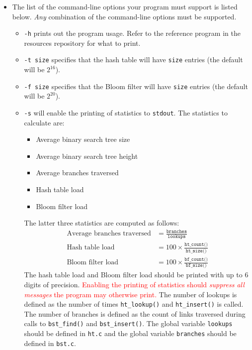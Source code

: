 \begin{itemize}
  \item The list of the command-line options your program must support
    is listed below. \emph{Any} combination of the command-line options
    must be supported.
    \begin{itemize}
      \item \texttt{-h} prints out the program usage. Refer to the
      reference program in the resources repository for what to print.
      \item \texttt{-t size} specifies that the hash table
        will have \texttt{size} entries (the default will be $2^{16}$).
      \item \texttt{-f size} specifies that the Bloom filter
        will have \texttt{size} entries (the default will be $2^{20}$).
      \item \texttt{-s} will enable the printing of statistics to
        \texttt{stdout}. The statistics to calculate are:
        \begin{itemize}
          \item Average binary search tree size
          \item Average binary search tree height
          \item Average branches traversed
          \item Hash table load
          \item Bloom filter load
        \end{itemize}
        The latter three statistics are computed as follows:
        \begin{align*}
          \text{Average branches traversed} &=
          \frac{\texttt{branches}}{\texttt{lookups}} \\
          \text{Hash table load} &= 100 \times \frac{\texttt{ht\_count()}}{\texttt{ht\_size()}} \\
          \text{Bloom filter load} &= 100 \times \frac{\texttt{bf\_count()}}{\texttt{bf\_size()}}
        \end{align*}
        The hash table load and Bloom filter load should be printed with
        up to 6 digits of precision. \textcolor{red}{Enabling the
        printing of statistics should \emph{suppress all messages} the
        program may otherwise print.} The number of lookups is defined
        as the number of times \texttt{ht\_lookup()} and
        \texttt{ht\_insert()} is called. The number of branches is
        defined as the count of links traversed during calls to
        \texttt{bst\_find()} and \texttt{bst\_insert()}. The global
        variable \texttt{lookups} should be defined in \texttt{ht.c} and
        the global variable \texttt{branches} should be defined in
        \texttt{bst.c}.
    \end{itemize}
\end{itemize}
